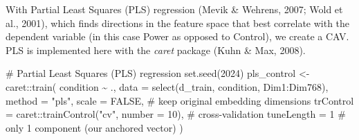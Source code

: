 \documentclass[
  man,
  floatsintext,
  longtable,
  nolmodern,
  notxfonts,
  notimes,
  colorlinks=true,linkcolor=blue,citecolor=blue,urlcolor=blue]{apa7}
\newenvironment{Shaded}{\begin{snugshade}}{\end{snugshade}}
\newcommand{\AttributeTok}[1]{\textcolor[rgb]{0.40,0.45,0.13}{#1}}
\newcommand{\CommentTok}[1]{\textcolor[rgb]{0.37,0.37,0.37}{#1}}
\newcommand{\ConstantTok}[1]{\textcolor[rgb]{0.56,0.35,0.01}{#1}}
\newcommand{\DecValTok}[1]{\textcolor[rgb]{0.68,0.00,0.00}{#1}}
\newcommand{\FunctionTok}[1]{\textcolor[rgb]{0.28,0.35,0.67}{#1}}
\newcommand{\NormalTok}[1]{\textcolor[rgb]{0.00,0.23,0.31}{#1}}
\newcommand{\OtherTok}[1]{\textcolor[rgb]{0.00,0.23,0.31}{#1}}
\newcommand{\SpecialCharTok}[1]{\textcolor[rgb]{0.37,0.37,0.37}{#1}}
\newcommand{\StringTok}[1]{\textcolor[rgb]{0.13,0.47,0.30}{#1}}
\begin{document}
With Partial Least Squares (PLS) regression (Mevik \& Wehrens, 2007;
Wold et al., 2001), which finds directions in the feature space that
best correlate with the dependent variable (in this case Power as
opposed to Control), we create a CAV. PLS is implemented here with the
\emph{caret} package (Kuhn \& Max, 2008).

\begin{Shaded}
\begin{Highlighting}[]
\CommentTok{\# Partial Least Squares (PLS) regression}
\FunctionTok{set.seed}\NormalTok{(}\DecValTok{2024}\NormalTok{)}
\NormalTok{pls\_control }\OtherTok{\textless{}{-}}\NormalTok{ caret}\SpecialCharTok{::}\FunctionTok{train}\NormalTok{(}
\NormalTok{  condition }\SpecialCharTok{\textasciitilde{}}\NormalTok{ ., }
  \AttributeTok{data =} \FunctionTok{select}\NormalTok{(d\_train, condition, Dim1}\SpecialCharTok{:}\NormalTok{Dim768), }
  \AttributeTok{method =} \StringTok{"pls"}\NormalTok{,}
  \AttributeTok{scale =} \ConstantTok{FALSE}\NormalTok{,  }\CommentTok{\# keep original embedding dimensions}
  \AttributeTok{trControl =}\NormalTok{ caret}\SpecialCharTok{::}\FunctionTok{trainControl}\NormalTok{(}\StringTok{"cv"}\NormalTok{, }\AttributeTok{number =} \DecValTok{10}\NormalTok{),  }\CommentTok{\# cross{-}validation}
  \AttributeTok{tuneLength =} \DecValTok{1}  \CommentTok{\# only 1 component (our anchored vector)}
\NormalTok{)}
\end{Highlighting}
\end{Shaded}
\end{document}
